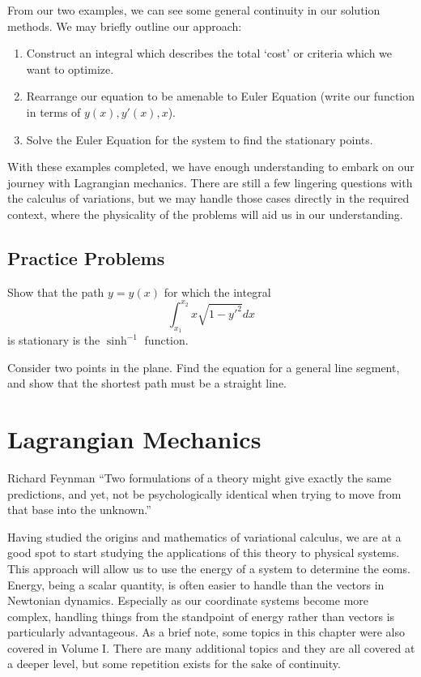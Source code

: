 From our two examples, we can see some general continuity in our solution methods. We may briefly outline our approach:
\begin{enumerate}
    \item Construct an integral which describes the total `cost' or criteria which we want to optimize.
    \item Rearrange our equation to be amenable to \gls{Euler Equation} (write our function in terms of $y(x), y'(x), x$).
    \item Solve the \gls{Euler Equation} for the system to find the stationary points.
\end{enumerate}

With these examples completed, we have enough understanding to embark on our journey with Lagrangian mechanics. There are still a few lingering questions with the calculus of variations, but we may handle those cases directly in the required context, where the physicality of the problems will aid us in our understanding.

\section{Practice Problems}
\begin{exercise}
    Show that the path $y=y(x)$ for which the integral $$\int_{x_1}^{x_2}x\sqrt{1-y'^2}dx$$ is stationary is the $\sinh^{-1}$ function.
\end{exercise}

\begin{exercise}
    Consider two points in the plane. Find the equation for a general line segment, and show that the shortest path must be a straight line.
\end{exercise}


\printendnotes

\chapter{Lagrangian Mechanics}\label{chap:lagrangian}

\begin{chapquote}{Richard Feynman}
 ``Two formulations of a theory might give exactly the same predictions, and yet, not be psychologically identical when trying to move from that base into the unknown.''
\end{chapquote}

Having studied the origins and mathematics of variational calculus, we are at a good spot to start studying the applications of this theory to physical systems. This approach will allow us to use the energy of a system to determine the \glspl{eom}. Energy, being a scalar quantity, is often easier to handle than the vectors in Newtonian dynamics. Especially as our coordinate systems become more complex, handling things from the standpoint of energy rather than vectors is particularly advantageous. As a brief note, some topics in this chapter were also covered in Volume I. There are many additional topics and they are all covered at a deeper level, but some repetition exists for the sake of continuity.

